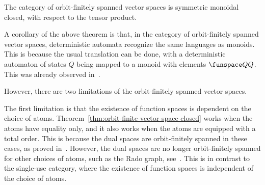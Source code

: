 

\begin{theorem}\label{thm:orbit-finite-vector-space-closed} The category of orbit-finitely spanned vector spaces is symmetric monoidal closed, with respect to the tensor product.
\end{theorem}


A corollary of the above theorem is that, in the category of orbit-finitely spanned vector spaces, deterministic automata recognize the same languages as monoids. This is because the usual translation can be done, with a deterministic automaton of states $Q$ being mapped to a monoid with elements $\funspace Q Q$. This was already observed in~\cite[Theorem VIII.3]{bojanczykKM21OrbitFiniteVector}.

However, there are two limitations of the orbit-finitely spanned vector spaces. 

The first limitation is that the existence of function spaces is dependent on the choice of atoms. Theorem~\ref{thm:orbit-finite-vector-space-closed}  works when the atoms have equality only, and it also works when the atoms are equipped with a total order. This is because the dual spaces are orbit-finitely spanned in these cases, as proved in~\cite[Corollary VI.5]{bojanczykKM21OrbitFiniteVector}. However, the dual spaces are no longer orbit-finitely spanned for other choices of  atoms, such as the Rado graph, see~\cite[Example 9]{bojanczykKM21OrbitFiniteVector}. This is in contrast to the single-use category, where the existence of function spaces is independent of the choice of atoms. 

